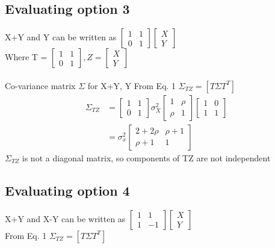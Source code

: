 \documentclass{article}
\begin{document}
\subsection{Evaluating option 3}
X+Y and Y can be written as $\begin{bmatrix}
    1 & 1 \\
    0 & 1
\end{bmatrix} 
\begin{bmatrix}
    X \\
    Y
\end{bmatrix}$\\
Where T = $\begin{bmatrix}
    1 & 1 \\
    0 & 1
\end{bmatrix}, Z = \begin{bmatrix}
   X \\
   Y
\end{bmatrix}$\\
\\
Co-variance matrix $\Sigma$ for X+Y, Y
From Eq. 1 $\Sigma_{TZ} = [T\Sigma T^T]$\\
\begin{align*}
\Sigma_{TZ} &= \begin{bmatrix}
   1   &   1\\
   0   &   1
\end{bmatrix} \sigma_X^2 
\begin{bmatrix}
   1    & \rho \\
   \rho &  1 
\end{bmatrix}
\begin{bmatrix}
   1   &   0\\
   1   &   1
\end{bmatrix}\\
& = \sigma_x^2
\begin{bmatrix}
   2 + 2\rho   &  \rho + 1\\
   \rho + 1    &   1
\end{bmatrix}
\end{align*}
$\Sigma_{TZ}$ is not a diagonal matrix, so components of TZ are not independent

\subsection{Evaluating option 4}
X+Y and X-Y can be written as 
$\begin{bmatrix}
    1 &  1 \\
    1 & -1
\end{bmatrix} 
\begin{bmatrix}
    X \\
    Y
\end{bmatrix}$\\
From Eq. 1 $\Sigma_{TZ} = [T\Sigma T^T]$
\end{document}

